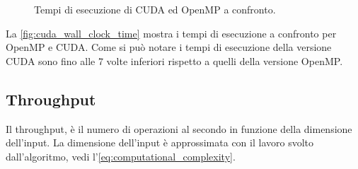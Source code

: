 \documentclass[12pt,a4paper]{report}
\begin{document}
\begin{figure}[H]
    \caption{\label{fig:cuda_wall_clock_time} Tempi di esecuzione di CUDA ed OpenMP a confronto.}
\end{figure}

La \autoref{fig:cuda_wall_clock_time} mostra i tempi di esecuzione a confronto per OpenMP e CUDA.
Come si può notare i tempi di esecuzione della versione CUDA sono fino alle 7 volte inferiori rispetto a quelli della versione
OpenMP.

\subsection{Throughput}

Il throughput, è il numero di operazioni al secondo in funzione della dimensione dell'input.
La dimensione dell'input è approssimata con il lavoro svolto dall'algoritmo, vedi l'\autoref{eq:computational_complexity}.
\end{document}
